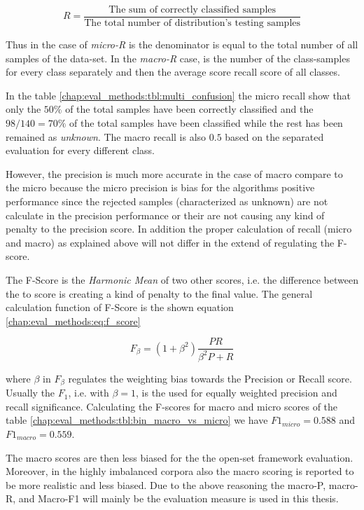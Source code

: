 {\begin{equation}\label{chap:eval_methods:eq:recall_theory}
	R = \frac {\text{The sum of correctly classified samples}} {\text{The total number of distribution's testing samples}}
\end{equation}

Thus in the case of \textit{micro-R} is the denominator is equal to the total number of all samples of the data-set. In the \textit{macro-R} case, is the number of the class-samples for every class separately and then the average score recall score of all classes.

In the table \ref{chap:eval_methods:tbl:multi_confusion} the micro recall show that only the $50\%$ of the total samples have been correctly classified and the $98/140 = 70\%$ of the total samples have been classified while the rest has been remained as \textit{unknown}. The macro recall is also $0.5$ based on the separated evaluation for every different class.

However, the precision is much more accurate in the case of macro compare to the micro because the micro precision is bias for the algorithms positive performance since the rejected samples (characterized as unknown) are not calculate in the precision performance or their are not causing any kind of penalty to the precision score. In addition the proper calculation of recall (micro and macro) as explained above will not differ in the extend of regulating the F-score.

The F-Score is the \textit{Harmonic Mean} of two other scores, i.e. the difference between the to score is creating a kind of penalty to the final value. The general calculation function of F-Score is the shown equation \ref{chap:eval_methods:eq:f_score}

\begin{equation}\label{chap:eval_methods:eq:recall}
	F_{\beta} = (1 + \beta^{2}) \frac {P R} {\beta^{2} P + R}
\end{equation}

\noindent
where $\beta$ in $F_{\beta}$ regulates the weighting bias towards the Precision or Recall score. Usually the $F_{1}$, i.e. with $\beta = 1$, is the used for equally weighted precision and recall significance. Calculating the F-scores for macro and micro scores of the table \ref{chap:eval_methods:tbl:bin_macro_vs_micro} we have $F1_{micro} = 0.588$ and $F1_{macro} = 0.559$.

The macro scores are then less biased for the the open-set framework evaluation. Moreover, in the highly imbalanced corpora also the macro scoring is reported to be more realistic and less biased. Due to the above reasoning the macro-P, macro-R, and Macro-F1 will mainly be the evaluation measure is used in this thesis.

}

